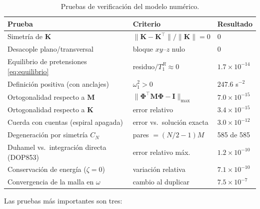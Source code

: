 \documentclass[11pt,letterpaper]{article}
\begin{document}
\begin{table}[H]
\centering\small
\caption{Pruebas de verificación del modelo numérico.}
\label{tab:verif}
\begin{tabular}{@{}p{7.2cm}p{4.6cm}l@{}}
\toprule
Prueba & Criterio & Resultado \\
\midrule
Simetría de $\mathbf{K}$ & $\|\mathbf{K}-\mathbf{K}^\top\|/\|\mathbf{K}\|=0$ & $0$ \\
Desacople plano/transversal & bloque $xy$--$z$ nulo & $0$ \\
Equilibrio de pretensiones \eqref{eq:equilibrio} & residuo$/T^R_1\approx0$ & $1.7\times10^{-14}$ \\
Definición positiva (con anclajes) & $\omega_1^2>0$ & $247.6$ s$^{-2}$ \\
Ortogonalidad respecto a $\mathbf{M}$ & $\|\boldsymbol{\Phi}^\top\mathbf{M}\boldsymbol{\Phi}-\mathbf{I}\|_{\max}$ & $7.0\times10^{-15}$ \\
Ortogonalidad respecto a $\mathbf{K}$ & error relativo & $3.4\times10^{-15}$ \\
Cuerda con cuentas (espiral apagada) & error vs.\ solución exacta & $3.0\times10^{-12}$ \\
Degeneración por simetría $C_N$ & pares $=(N/2-1)M$ & 585 de 585 \\
Duhamel vs.\ integración directa (DOP853) & error relativo máx. & $1.2\times10^{-10}$ \\
Conservación de energía ($\zeta=0$) & variación relativa & $7.1\times10^{-10}$ \\
Convergencia de la malla en $\omega$ & cambio al duplicar & $7.5\times10^{-7}$ \\
\bottomrule
\end{tabular}
\end{table}

Las pruebas más importantes son tres:
\end{document}
